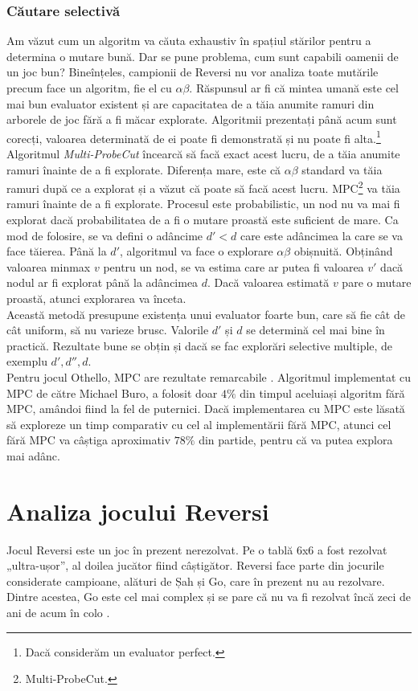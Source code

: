 \documentclass[12pt,twoside,a4paper,fleqn]{book}
\theoremstyle{definition}
\begin{document}
\subsection{Căutare selectivă}
\label{cautare_selectiva}
Am văzut cum un algoritm va căuta exhaustiv în spațiul stărilor pentru a determina o mutare bună. Dar se pune problema, cum sunt capabili oamenii de un joc bun? Bineînțeles, campionii de Reversi nu vor analiza toate mutările precum face un algoritm, fie el cu $\alpha \beta$. Răspunsul ar fi că mintea umană este cel mai bun evaluator existent și are capacitatea de a tăia anumite ramuri din arborele de joc fără a fi măcar explorate. Algoritmii prezentați până acum sunt corecți, valoarea determinată de ei poate fi demonstrată și nu poate fi alta.\footnote{Dacă considerăm un evaluator perfect.}\\
Algoritmul \emph{Multi-ProbeCut} \cite{buro_mpc_curs, buro_mpc} încearcă să facă exact acest lucru, de a tăia anumite ramuri înainte de a fi explorate. Diferența mare, este că $\alpha \beta$ standard va tăia ramuri după ce a explorat și a văzut că poate să facă acest lucru. MPC\footnote{Multi-ProbeCut.} va tăia ramuri înainte de a fi explorate. Procesul este probabilistic, un nod nu va mai fi explorat dacă probabilitatea de a fi o mutare proastă este suficient de mare. Ca mod de folosire, se va defini o adâncime $d' < d$ care este adâncimea la care se va face tăierea. Până la $d'$, algoritmul va face o explorare $\alpha \beta$ obișnuită. Obținând valoarea minmax $v$ pentru un nod, se va estima care ar putea fi valoarea $v'$ dacă nodul ar fi explorat până la adâncimea $d$. Dacă valoarea estimată $v$ pare o mutare proastă, atunci explorarea va înceta.\\
Această metodă presupune existența unui evaluator foarte bun, care să fie cât de cât uniform, să nu varieze brusc. Valorile $d'$ și $d$ se determină cel mai bine în practică. Rezultate bune se obțin și dacă se fac explorări selective multiple, de exemplu $d', d'', d$.\\
Pentru jocul Othello, MPC are rezultate remarcabile \cite{buro_mpc}. Algoritmul implementat cu MPC de către Michael Buro, a folosit doar $4\%$ din timpul aceluiași algoritm fără MPC, amândoi fiind la fel de puternici. Dacă implementarea cu MPC este lăsată să exploreze un timp comparativ cu cel al implementării fără MPC, atunci cel fără MPC va câștiga aproximativ $78\%$ din partide, pentru că va putea explora mai adânc.


\chapter{Analiza jocului Reversi}
Jocul Reversi este un joc în prezent nerezolvat. Pe o tablă 6x6 a fost rezolvat „ultra-ușor”, al doilea jucător fiind câștigător. Reversi face parte din jocurile considerate campioane, alături de Șah și Go, care în prezent nu au rezolvare. Dintre acestea, Go este cel mai complex și se pare că nu va fi rezolvat încă zeci de ani de acum în colo \cite{allis, games_solved_herik}.
\end{document}
